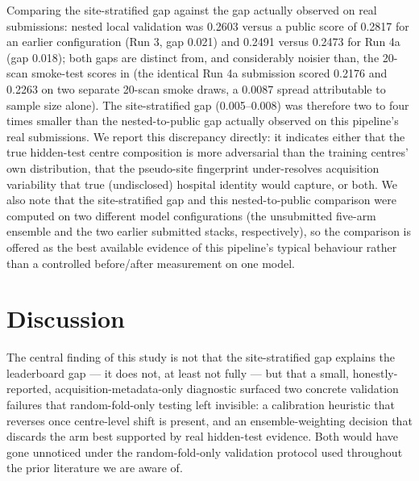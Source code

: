 \documentclass[11pt]{article}
\begin{document}
Comparing the site-stratified gap against the gap actually observed on real submissions: nested local validation was 0.2603 versus a public score of 0.2817 for an earlier configuration (Run 3, gap 0.021) and 0.2491 versus 0.2473 for Run 4a (gap 0.018); both gaps are distinct from, and considerably noisier than, the 20-scan smoke-test scores in  (the identical Run 4a submission scored 0.2176 and 0.2263 on two separate 20-scan smoke draws, a 0.0087 spread attributable to sample size alone). The site-stratified gap (0.005--0.008) was therefore two to four times smaller than the nested-to-public gap actually observed on this pipeline's real submissions. We report this discrepancy directly: it indicates either that the true hidden-test centre composition is more adversarial than the training centres' own distribution, that the pseudo-site fingerprint under-resolves acquisition variability that true (undisclosed) hospital identity would capture, or both. We also note that the site-stratified gap and this nested-to-public comparison were computed on two different model configurations (the unsubmitted five-arm ensemble and the two earlier submitted stacks, respectively), so the comparison is offered as the best available evidence of this pipeline's typical behaviour rather than a controlled before/after measurement on one model.

\section*{Discussion}

The central finding of this study is not that the site-stratified gap explains the leaderboard gap --- it does not, at least not fully --- but that a small, honestly-reported, acquisition-metadata-only diagnostic surfaced two concrete validation failures that random-fold-only testing left invisible: a calibration heuristic that reverses once centre-level shift is present, and an ensemble-weighting decision that discards the arm best supported by real hidden-test evidence. Both would have gone unnoticed under the random-fold-only validation protocol used throughout the prior literature we are aware of.
\end{document}
